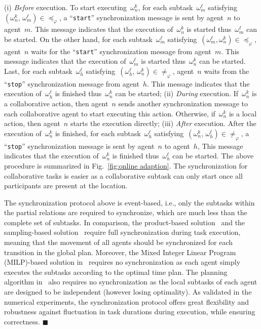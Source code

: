(i) \emph{Before} execution.
To start executing~$\omega^k_n$,
for each subtask~$\omega^\ell_m$
satisfying~$(\omega^k_n,\,\omega^\ell_m)\in \preceq_{\varphi}$,
a ``\texttt{start}'' synchronization message is sent by agent~$n$ to agent~$m$.
This message indicates that the execution of~$\omega^k_n$ is started
thus~$\omega^\ell_m$ can be started.
On the other hand, for each subtask~$\omega^\ell_m$
satisfying~$(\omega^\ell_m, \omega^k_n)\in \preceq_{\varphi}$,
agent~$n$ waits for the ``\texttt{start}'' synchronization message
from agent~$m$.
This message indicates that the execution of~$\omega^\ell_m$ is started
thus~$\omega^k_n$ can be started.
Last, for each subtask~$\omega^\ell_h$
satisfying~$(\omega^\ell_h,\,\omega^k_n)\in \neq_{\varphi}$,
agent~$n$ waits from the ``\texttt{stop}'' synchronization message
from agent~$h$.
This message indicates that the execution of~$\omega^\ell_h$ is finished
thus~$\omega^k_n$ can be started;
(ii) \emph{During} execution.
If~$\omega^k_n$ is a collaborative action, then
agent~$n$ sends another synchronization message to each collaborative agent
to start executing this action.
Otherwise, if~$\omega^k_n$ is a local action, then agent~$n$ starts the
execution directly;
(iii) \emph{After} execution.
After the execution of~$\omega^k_n$ is finished,
for each subtask~$\omega^\ell_h$
satisfying~$(\omega^k_n,\,\omega^\ell_h)\in \neq_{\varphi}$,
a ``\texttt{stop}'' synchronization message is sent by agent~$n$ to agent~$h$,
This message indicates that the execution of~$\omega^k_n$ is finished
thus~$\omega^\ell_h$ can be started.
The above procedure is summarized in Fig.~\ref{fig:online adaption}.
The synchronization for collaborative tasks is easier as a collaborative
subtask can only start once all participants are present at the location.

\begin{remark}\label{remark:syn}
The synchronization protocol above is event-based,
i.e.,  only the subtasks within the partial relations
are required to synchronize,
which are much less than the complete set of subtasks.
In comparison, the product-based solution~\cite{baier2008principles}
and the sampling-based solution~\cite{kantaros2020stylus}
require full synchronization during task execution,
meaning that the movement of all agents should be synchronized for each
transition in the global plan.
Moreover, the Mixed Integer Linear Program (MILP)-based solution
in~\cite{luo2021temporal, jones2019scratchs}
requires no synchronization as each agent simply executes the subtasks
according to the optimal time plan.
The planning algorithm in~\cite{schillinger2018simultaneous}
also requires no synchronization as the local subtasks of each agent
are designed to be independent (however losing optimality).
As validated in the numerical experiments,
the synchronization protocol offers great flexibility
and robustness against fluctuation in task durations during execution,
while ensuring correctness.
\hfill  $\blacksquare$
\end{remark}


